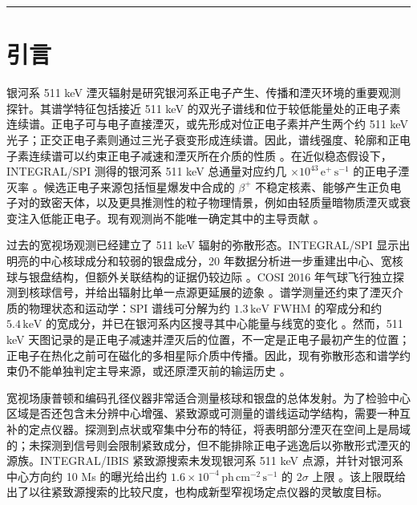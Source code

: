 \documentclass[11pt]{article}
\newcommand{\keV}{\,\mathrm{keV}}
\newcommand{\phcms}{\,\mathrm{ph\,cm^{-2}\,s^{-1}}}
\begin{document}
\vspace{0.3em}
\noindent\rule{\textwidth}{0.4pt}
\vspace{1.0em}

\section{引言}
\label{sec:intro}

银河系 511 keV 湮灭辐射是研究银河系正电子产生、传播和湮灭环境的重要观测探针。其谱学特征包括接近 511 keV 的双光子谱线和位于较低能量处的正电子素连续谱。正电子可与电子直接湮灭，或先形成对位正电子素并产生两个约 511 keV 光子；正交正电子素则通过三光子衰变形成连续谱。因此，谱线强度、轮廓和正电子素连续谱可以约束正电子减速和湮灭所在介质的性质 \cite{Prantzos2011,Jean2006}。在近似稳态假设下，INTEGRAL/SPI 测得的银河系 511 keV 总通量对应约几 $\times10^{43}\,\mathrm{e^+\,s^{-1}}$ 的正电子湮灭率 \cite{Prantzos2011,Kierans2020}。候选正电子来源包括恒星爆发中合成的 $\beta^+$ 不稳定核素、能够产生正负电子对的致密天体，以及更具推测性的粒子物理情景，例如由轻质量暗物质湮灭或衰变注入低能正电子。现有观测尚不能唯一确定其中的主导贡献 \cite{Prantzos2011,Siegert2016AA,Siegert2016V404}。

过去的宽视场观测已经建立了 511 keV 辐射的弥散形态。INTEGRAL/SPI 显示出明亮的中心核球成分和较弱的银盘成分，20 年数据分析进一步重建出中心、宽核球与银盘结构，但额外关联结构的证据仍较边际 \cite{Knodlseder2005AllSky,Siegert2016AA,Yoneda2025}。COSI 2016 年气球飞行独立探测到核球信号，并给出辐射比单一点源更延展的迹象 \cite{Kierans2020,Siegert2020COSI}。谱学测量还约束了湮灭介质的物理状态和运动学：SPI 谱线可分解为约 $1.3\keV$ FWHM 的窄成分和约 $5.4\keV$ 的宽成分，并已在银河系内区搜寻其中心能量与线宽的变化 \cite{Jean2006,Siegert2019Kinematics}。然而，511 keV 天图记录的是正电子减速并湮灭后的位置，不一定是正电子最初产生的位置；正电子在热化之前可在磁化的多相星际介质中传播。因此，现有弥散形态和谱学约束仍不能单独判定主导来源，或还原湮灭前的输运历史 \cite{Prantzos2011}。

宽视场康普顿和编码孔径仪器非常适合测量核球和银盘的总体发射。为了检验中心区域是否还包含未分辨中心增强、紧致源或可测量的谱线运动学结构，需要一种互补的定点仪器。探测到点状或窄集中分布的特征，将表明部分湮灭在空间上是局域的；未探测到信号则会限制紧致成分，但不能排除正电子逃逸后以弥散形式湮灭的源族。INTEGRAL/IBIS 紧致源搜索未发现银河系 511 keV 点源，并针对银河系中心方向约 10 Ms 的曝光给出约 $1.6\times10^{-4}\phcms$ 的 $2\sigma$ 上限 \cite{DeCesare2011}。该上限既给出了以往紧致源搜索的比较尺度，也构成新型窄视场定点仪器的灵敏度目标。
\end{document}
